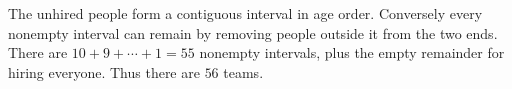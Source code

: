 The unhired people form a contiguous interval in age order. Conversely every nonempty interval can remain by removing people outside it from the two ends. There are $10+9+\cdots+1=55$ nonempty intervals, plus the empty remainder for hiring everyone. Thus there are $\boxed{56}$ teams.
